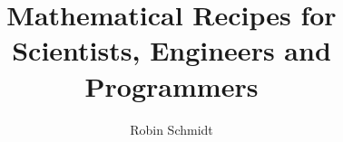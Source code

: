 



	
\parindent=0in
\parskip=0pt
		
 \setcounter{page}{1}

\author{Robin Schmidt}

\title{Mathematical Recipes for Scientists, Engineers and Programmers}
\maketitle

%
%

 
 
% 
%


% 
%
% 
%
%
%
% 
%




%
%
%
% 

